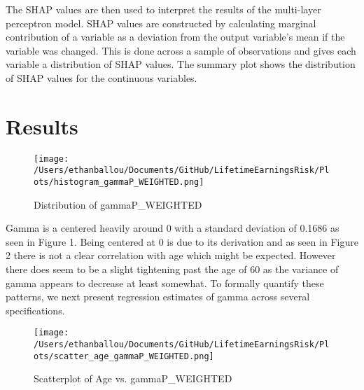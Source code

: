 \documentclass[12pt]{article}
\begin{document}
\begin{onehalfspace}
The SHAP values are then used to interpret the results of the multi-layer perceptron model. SHAP values are constructed by calculating marginal contribution of a variable as a deviation from the output variable's mean if the variable was changed. This is done across a sample of observations and gives each variable a distribution of SHAP values. The summary plot shows the distribution of SHAP values for the continuous variables. 

\section{Results}



\begin{figure}[H]
    \centering
    \texttt{[image: /Users/ethanballou/Documents/GitHub/LifetimeEarningsRisk/Plots/histogram\_gammaP\_WEIGHTED.png]}
    \caption{Distribution of gammaP\_WEIGHTED}
\end{figure}






Gamma is a centered heavily around 0 with a standard deviation of 0.1686 as seen in Figure 1. Being centered at 0 is due to its derivation and as seen in Figure 2 there is not a clear correlation with age which might be expected. However there does seem to be a slight tightening past the age of 60 as the variance of gamma appears to decrease at least somewhat. To formally quantify these patterns, we next present regression estimates of gamma across several specifications.


\begin{figure}[H]
    \centering
    \texttt{[image: /Users/ethanballou/Documents/GitHub/LifetimeEarningsRisk/Plots/scatter\_age\_gammaP\_WEIGHTED.png]}
    \caption{Scatterplot of Age vs. gammaP\_WEIGHTED}
\end{figure}




\end{onehalfspace}
\end{document}

